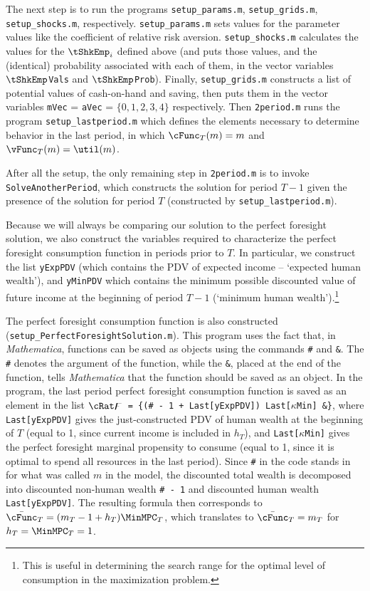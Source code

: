 \documentclass[titlepage]{\econtex}
\newcommand{\Mma}{\textit{Mathematica}}
\begin{document}
The next step is to
run the programs \texttt{setup\_params.m}, \texttt{setup\_grids.m},
\texttt{setup\_shocks.m}, respectively. \texttt{setup\_params.m} sets values for the
parameter values like the coefficient of relative risk aversion.
\texttt{setup\_shocks.m} calculates the values for the $\tShkEmp_{i}$
defined above (and puts those values, and the (identical) probability associated
with each of them, in the vector variables \texttt{$\tShkEmp$Vals} and
\texttt{$\tShkEmp$Prob}).  Finally, \texttt{setup\_grids.m} constructs a
list of potential values of cash-on-hand and saving, then puts them in the vector
variables \texttt{mVec} = \texttt{aVec} = $\{0,1,2,3,4\}$ respectively.
Then \texttt{2period.m} runs the program \texttt{setup\_lastperiod.m}
which defines the elements necessary to determine behavior in the last
period, in which $\cFunc_{T}(m)=m$ and $\vFunc_{T}(m)=\util(m)$.

After all the setup, the only remaining step in
\texttt{2period.m} is to invoke \texttt{SolveAnotherPeriod}, which
constructs the solution for period $T-1$ given the presence of the
solution for period $T$ (constructed by \texttt{setup\_lastperiod.m}).

Because we will always be comparing our solution to the perfect
foresight solution, we also construct the variables required to
characterize the perfect foresight consumption function in periods
prior to $T$.  In particular, we construct the list \texttt{yExpPDV}
(which contains the PDV of expected income -- `expected human
wealth'), and \texttt{yMinPDV} which contains the minimum possible
discounted value of future income at the beginning of period $T-1$
(`minimum human wealth').\footnote{This is useful in determining the
  search range for the optimal level of consumption in the
  maximization problem.}

The perfect foresight consumption function is also constructed
(\texttt{setup\_PerfectForesightSolution.m}).  This program uses the
fact that, in {\Mma}, functions can be saved as objects using the
commands \texttt{\#} and \texttt{\&}. The \texttt{\#} denotes the
argument of the function, while the \texttt{\&}, placed at the end of
the function, tells {\Mma} that the function should be saved as an
object. In the program, the last period perfect foresight consumption
function is saved as an element in the list \texttt{$\cRat\digamma$ =
  \{(\# - 1 + Last[yExpPDV]) Last[$\kappa$Min] \&\}}, where
\texttt{Last[yExpPDV]} gives the just-constructed PDV of human wealth
at the beginning of $T$ (equal to 1, since current income is included
in $h_{T}$), and \texttt{Last[$\kappa$Min]} gives the perfect
foresight marginal propensity to consume (equal to 1, since it is
optimal to spend all resources in the last period). Since \texttt{\#}
in the code stands in for what was called $m$ in the model, the
discounted total wealth is decomposed into discounted non-human wealth
\texttt{\# - 1} and discounted human wealth
\texttt{Last[yExpPDV]}. The resulting formula then corresponds to
$\bar{\cFunc}_{T} = (m_{T}-1+{h}_{T})\MinMPC_{T}$, which translates to
$\bar{\cFunc}_{T} = m_{T}$ for ${h}_{T}=\MinMPC_{T}=1$.
\end{document}
